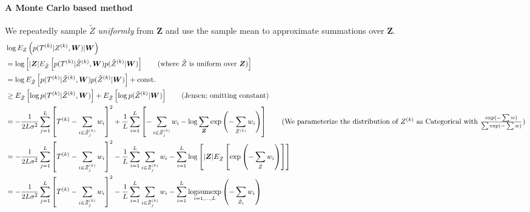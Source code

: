 \documentclass[12pt]{article}
\begin{document}
\paragraph{A Monte Carlo based method} We repeatedly sample $\tilde Z$ \emph{uniformly} from $\bm Z$ and use the sample mean to approximate summations over $\bm Z$. \begin{align*}
&\log E_Z\pr{p(T\uppr{k} | Z\uppr{k}, \bm W)| \bm W} \\&= \log\bk{ |\bm Z|E_{\tilde Z}\bk{p(T\uppr{k} | \tilde Z\uppr{k},\bm W)p(\tilde Z\uppr{k} | \bm W)} \tag{where $\tilde Z$ is uniform over $\bm Z$}} \\
&= \log E_{\tilde Z}\bk{p(T\uppr{k} | \tilde Z\uppr{k},\bm W)p(\tilde Z\uppr{k} | \bm W)} + \text{const.} \\
&\ge E_{\tilde Z}\bk{\log p(T\uppr{k} | \tilde Z\uppr{k},\bm W)} + E_{\tilde Z}\bk{\log p(\tilde Z\uppr{k} | \bm W)} \tag{Jensen; omitting constant}\\
&= -\frac{1}{2L\sigma^2}\sum_{j=1}^L \bk{T\uppr{k} - \sum_{i\in \tilde Z\uppr{k}_j}w_i}^2 + \frac{1}{L}\sum_{i=1}^L \bk{-\sum_{i\in\tilde Z_{j}\uppr{k}}w_i - \log \sum_{\bm Z} \exp\pr{-\sum_{Z\uppr{k}} w_i}}  \tag{We parameterize the distribution of $Z\uppr{k}$ as Categorical with $\frac{\exp(-\sum w)}{\sum \exp(-\sum w)}$} \\
&= -\frac{1}{2L\sigma^2}\sum_{j=1}^L \bk{T\uppr{k} - \sum_{i\in \tilde Z\uppr{k}_j}w_i}^2 - \frac{1}{L}\sum_{i=1}^L \sum_{i\in\tilde Z_{j}\uppr{k}}w_i - \sum_{i=1}^L \log\bk{|\bm Z| E_{\tilde Z}\bk{\exp\pr{-\sum_{\tilde Z} w_i}}} \\
&= -\frac{1}{2L\sigma^2}\sum_{j=1}^L \bk{T\uppr{k} - \sum_{i\in \tilde Z\uppr{k}_j}w_i}^2 - \frac{1}{L}\sum_{i=1}^L\sum_{i\in\tilde Z_{j}\uppr{k}}w_i - \sum_{i=1}^L \underset{i=1,\ldots,L}{\text{logsumexp}}\pr{-\sum_{\tilde Z_i} w_i}
\end{align*}
\end{document}
